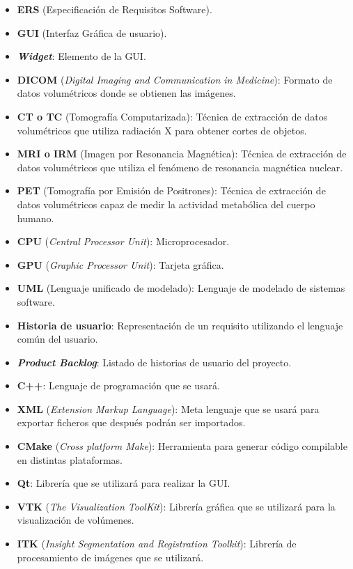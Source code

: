 \begin{itemize}
	\item \textbf{ERS} (Especificación de Requisitos Software).
	\item \textbf{GUI} (Interfaz Gráfica de usuario).
	\item \textbf{\textit{Widget}}: Elemento de la GUI.
	\item \textbf{DICOM} (\textit{Digital Imaging and Communication in Medicine}): Formato de datos volumétricos donde se obtienen las imágenes.
	\item \textbf{CT o TC} (Tomografía Computarizada): Técnica de extracción de datos volumétricos que utiliza radiación X para obtener cortes de objetos.
	\item \textbf{MRI o IRM} (Imagen por Resonancia Magnética): Técnica de extracción de datos volumétricos que utiliza el fenómeno de resonancia magnética nuclear.
	\item \textbf{PET} (Tomografía por Emisión de Positrones): Técnica de extracción de datos volumétricos capaz de medir la actividad metabólica del cuerpo humano.
	\item \textbf{CPU} (\textit{Central Processor Unit}): Microprocesador.
	\item \textbf{GPU} (\textit{Graphic Processor Unit}): Tarjeta gráfica.
	\item \textbf{UML} (Lenguaje unificado de modelado): Lenguaje de modelado de sistemas software.
	\item \textbf{Historia de usuario}: Representación de un requisito utilizando el lenguaje común del usuario.
	\item \textbf{\textit{Product Backlog}}: Listado de historias de usuario del proyecto.
	\item \textbf{C++}: Lenguaje de programación que se usará.
	\item \textbf{XML} (\textit{Extension Markup Language}): Meta lenguaje que se usará para exportar ficheros que después podrán ser importados.
	\item \textbf{CMake} (\textit{Cross platform Make}): Herramienta para generar código compilable en distintas plataformas.
	\item \textbf{Qt}: Librería que se utilizará para realizar la GUI.
	\item \textbf{VTK} (\textit{The Visualization ToolKit}): Librería gráfica que se utilizará para la visualización de volúmenes.
	\item \textbf{ITK} (\textit{Insight Segmentation and Registration Toolkit}): Librería de procesamiento de imágenes que se utilizará.

\end{itemize}
